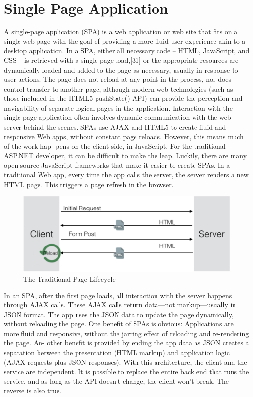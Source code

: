 \section{Single Page Application}
\label{sec:single_page_application}

A single-page application (SPA) is a web application or web site that fits on a single web page with the goal of providing a more fluid user experience akin to a desktop application. In a SPA, either all necessary code – HTML, JavaScript, and CSS – is retrieved with a single page load,[31] or the appropriate resources are dynamically loaded and added to the page as necessary, usually in response to user actions. The page does not reload at any point in the process, nor does control transfer to another page, although modern web technologies (such as those included in the HTML5 pushState() API) can provide the perception and navigability of separate logical pages in the application. Interaction with the single page application often involves dynamic communication with the web server behind the scenes. 
SPAs use AJAX and HTML5 to create fluid and responsive Web apps, without constant page reloads. However, this means much of the work hap- pens on the client side, in JavaScript. For the traditional ASP.NET developer, it can be difficult to make the leap. Luckily, there are many open source JavaScript frameworks that make it easier to create SPAs. 
In a traditional Web app, every time the app calls the server, the server renders a new HTML page. This triggers a page refresh in the browser.

\begin{figure}[htb] %
 \centering
 \includegraphics[width=1.0\linewidth]{images/chapter4/no_spa.png}\hfill
 \caption[The Traditional Page Lifecycle]{The Traditional Page Lifecycle}
 \label{fig:fourV}
\end{figure}

 In an SPA, after the first page loads, all interaction with the server happens through AJAX calls. These AJAX calls return data—not markup—usually in JSON format. The app uses the JSON data to update the page dynamically, without reloading the page. 
One benefit of SPAs is obvious: Applications are more fluid and responsive, without the jarring effect of reloading and re-rendering the page. An- other benefit is provided by ending the app data as JSON creates a separation between the presentation (HTML markup) and application logic (AJAX requests plus JSON responses). With this architecture, the client and the service are independent. It is possible to replace the entire back end that runs the service, and as long as the API doesn’t change, the client won’t break. The reverse is also true.

